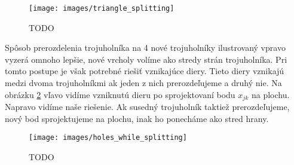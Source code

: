 \begin{figure}
    \centerline{\texttt{[image: images/triangle\_splitting]}}
    \caption[TODO]{TODO}
    \label{obr:triangle_splitting}
\end{figure}

Spôsob prerozdelenia 
trojuholníka na 4 nové trojuholníky ilustrovaný vpravo vyzerá omnoho lepšie, nové vrcholy
volíme ako stredy strán trojuholníka. Pri tomto postupe je však potrebné riešiť vznikajúce diery.
Tieto diery vznikajú medzi dvoma trojuholníkmi ak jeden z nich prerozdeľujeme
a druhý nie. Na obrázku \ref{obr:holes_while_splitting} vľavo vidíme vzniknutú dieru po sprojektovaní bodu
$x_{jk}$ na plochu. Napravo vidíme naše riešenie. Ak susedný trojuholník taktiež prerozdeľujeme, nový bod
sprojektujeme na plochu, inak ho ponecháme ako stred hrany.

\begin{figure}
    \centerline{\texttt{[image: images/holes\_while\_splitting]}}
    \caption[TODO]{TODO}
    \label{obr:holes_while_splitting}
\end{figure}